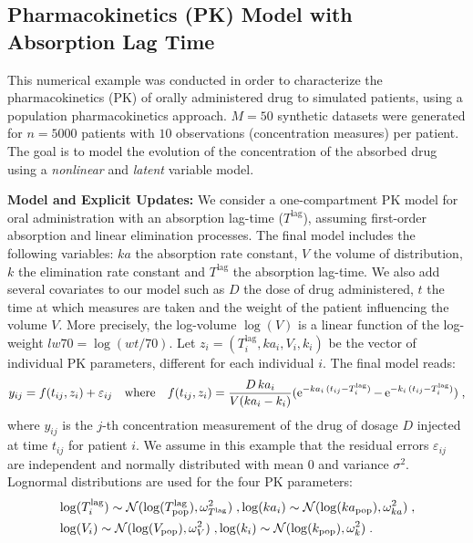 \documentclass[journal, 11pt]{IEEEtran}
\begin{document}
\subsection{Pharmacokinetics (PK) Model with Absorption Lag Time}
This numerical example was conducted in order to characterize the pharmacokinetics (PK) of orally administered drug to simulated patients, using a population pharmacokinetics approach. $M = 50$ synthetic datasets were generated for $n = 5000$ patients with $10$ observations (concentration measures) per patient.
The goal is to model the evolution of the concentration of the absorbed drug using a \emph{nonlinear} and \emph{latent} variable model. 

\vspace{0.08in}
\noindent \textbf{Model and Explicit Updates:}
We consider a one-compartment PK model for oral administration with an absorption lag-time ($T^{\textrm{lag}}$), assuming first-order absorption and linear elimination processes.
The final model includes the following variables: $ka$ the absorption rate constant, $V$ the volume of distribution, $k$ the elimination rate constant and $T^{\textrm{lag}}$ the absorption lag-time. 
We also add several covariates to our model such as $D$ the dose of drug administered, $t$ the time at which measures are taken and the weight of the patient influencing the volume $V$. More precisely, the log-volume $\log(V)$ is a linear function of the log-weight $lw70= \log(wt/70)$.
Let $ z_i=(T_i^{\textrm{lag}}, ka_i, V_i, k_i)$ be the vector of individual PK parameters, different for each individual $i$.
The final model reads:
\begin{equation} \label{eq:pkmodel}
\begin{split}
 y_{ij} = f(t_{ij},z_i)+ \varepsilon_{ij} \quad  \textrm{where} \quad f(t_{ij},z_i) = \frac{D\,ka_i}{V(ka_i - k_i)}(\exponential^{-ka_i\,(t_{ij} - T_i^{\textrm{lag}})}-\exponential^{-k_i\,(t_{ij} - T_i^{\textrm{lag}})})\eqs,
\end{split}
\end{equation}
where $y_{ij}$ is the $j$-th concentration measurement of the drug of dosage $D$ injected at time $t_{ij}$ for patient $i$.
We assume in this example that the residual errors $\varepsilon_{ij}$ are independent and normally distributed with mean 0 and variance $\sigma^2$.
Lognormal distributions are used for the four PK parameters:
\begin{align}
& \log(T_i^{\textrm{lag}}) \sim \mathcal{N}(\log(T^{\textrm{lag}}_{\rm pop}), \omega^2_{T^{\textrm{lag}}} ) \;, \log(ka_i) \sim \mathcal{N}(\log(ka_{\rm pop}), \omega^2_{ka})\;,\notag\\
&\log(V_i) \sim \mathcal{N}(\log(V_{\rm pop}), \omega^2_{V})\;,
 \log(k_i) \sim \mathcal{N}(\log(k_{\rm pop}), \omega^2_{k})\;.\notag
\end{align}
\end{document}
